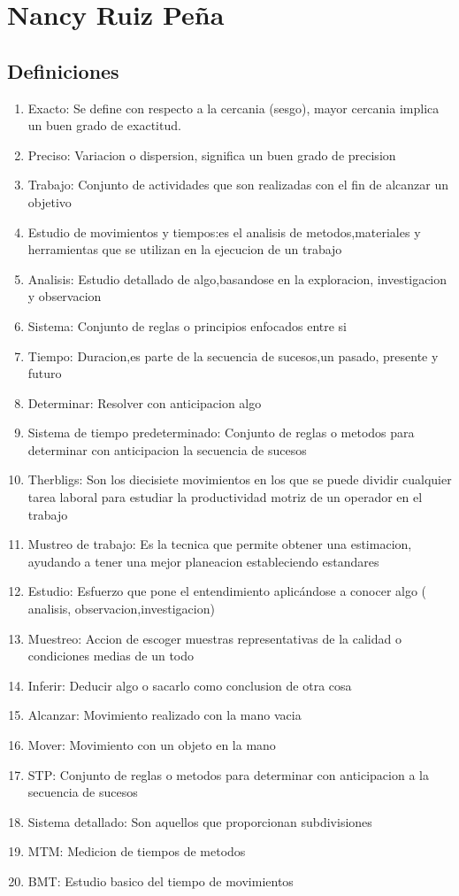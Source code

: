 \section{Nancy Ruiz Peña}
\subsection{Definiciones}

\begin{enumerate}
    \item Exacto: Se define con respecto a la cercania (sesgo), mayor cercania implica un buen grado de exactitud.
    \item Preciso: Variacion o dispersion, significa un buen grado de precision 
    \item Trabajo: Conjunto de actividades que son realizadas con el fin de alcanzar un objetivo
    \item Estudio de movimientos y tiempos:es el analisis de metodos,materiales y herramientas que se utilizan en la ejecucion de un trabajo 
    \item Analisis: Estudio detallado de algo,basandose en la exploracion, investigacion y observacion 
    \item Sistema: Conjunto de reglas o principios  enfocados entre si 
    \item Tiempo: Duracion,es parte de la secuencia de  sucesos,un 
     pasado, presente y  futuro 
   \item Determinar: Resolver con anticipacion  algo 
  \item Sistema de tiempo predeterminado: Conjunto de reglas o metodos para determinar con anticipacion la secuencia de sucesos 
   \item Therbligs: Son los diecisiete movimientos en los que se puede dividir cualquier tarea laboral para estudiar la productividad motriz de un operador en el trabajo 
   \item Mustreo de trabajo: Es la tecnica que permite obtener una estimacion, ayudando a tener una mejor planeacion estableciendo estandares 
    \item Estudio: Esfuerzo que pone el entendimiento aplicándose a conocer algo ( analisis, observacion,investigacion)
   \item  Muestreo: Accion de escoger muestras representativas de la calidad o condiciones medias de un todo 
  \item Inferir: Deducir algo o sacarlo como conclusion de otra cosa 
   \item Alcanzar: Movimiento realizado con la mano vacia 
   \item Mover: Movimiento con un objeto en la mano 
   \item STP: Conjunto de reglas o metodos para determinar con anticipacion a la secuencia de sucesos 
    \item Sistema detallado: Son aquellos que proporcionan subdivisiones 
     \item MTM: Medicion de tiempos de metodos 
      \item BMT: Estudio basico del tiempo de movimientos 
\end{enumerate}